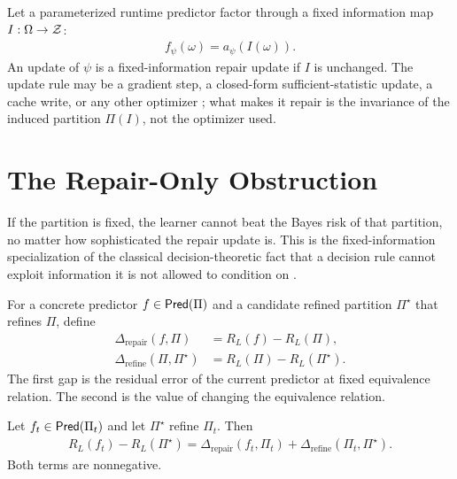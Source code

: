 \begin{definition}
\label{def:fixed-information-repair}
Let a parameterized runtime predictor factor through a fixed information map $I:\Omega\to\mathcal{Z}$:
\begin{align*}
f_\psi(\omega)=a_\psi(I(\omega)).
\end{align*}
An update of $\psi$ is a fixed-information repair update if $I$ is unchanged. The update rule may be a gradient step, a closed-form sufficient-statistic update, a cache write, or any other optimizer \citep{rumelhart1986learning,zinkevich2003online,shalev2012online,grave2017improving,khandelwal2020generalization,ba2016using,schlag2021linear}; what makes it repair is the invariance of the induced partition $\Pi(I)$, not the optimizer used.
\end{definition}

\section{The Repair-Only Obstruction}
\label{sec:repair-obstruction}

If the partition is fixed, the learner cannot beat the Bayes risk of that partition, no matter how sophisticated the repair update is. This is the fixed-information specialization of the classical decision-theoretic fact that a decision rule cannot exploit information it is not allowed to condition on \citep{blackwell1953equivalent,berger1985statistical}.

\begin{definition}
\label{def:repair-refinement-gaps}
For a concrete predictor $f\in\mathsf{Pred}(\Pi)$ and a candidate refined partition $\Pi^\star$ that refines $\Pi$, define
\begin{align*}
\Delta_{\mathrm{repair}}(f,\Pi)
&=R_L(f)-R_L(\Pi),\\
\Delta_{\mathrm{refine}}(\Pi,\Pi^\star)
&=R_L(\Pi)-R_L(\Pi^\star).
\end{align*}
The first gap is the residual error of the current predictor at fixed equivalence relation. The second is the value of changing the equivalence relation.
\end{definition}

\begin{theorem}
\label{thm:error-decomposition}
Let $f_t\in\mathsf{Pred}(\Pi_t)$ and let $\Pi^\star$ refine $\Pi_t$. Then
\begin{align*}
R_L(f_t)-R_L(\Pi^\star)
=
\Delta_{\mathrm{repair}}(f_t,\Pi_t)
+
\Delta_{\mathrm{refine}}(\Pi_t,\Pi^\star).
\end{align*}
Both terms are nonnegative.
\end{theorem}

